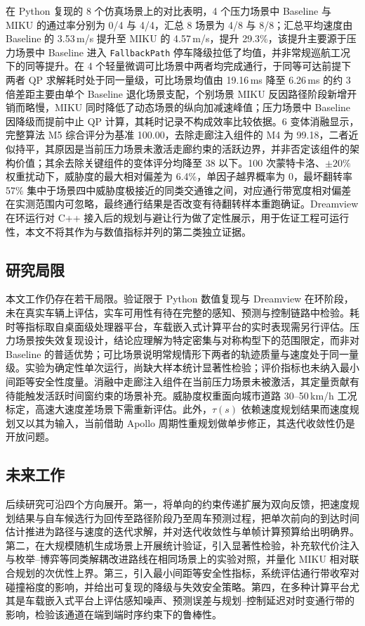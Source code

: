 \documentclass[a4paper,11pt]{ctexart}
\theoremstyle{definition}
\begin{document}
在 Python 复现的 8 个仿真场景上的对比表明，4 个压力场景中 Baseline 与 MIKU 的通过率分别为 0/4 与 4/4，汇总 8 场景为 4/8 与 8/8；汇总平均速度由 Baseline 的 3.53\,m/s 提升至 MIKU 的 4.57\,m/s，提升 29.3\%，该提升主要源于压力场景中 Baseline 进入 \texttt{FallbackPath} 停车降级拉低了均值，并非常规巡航工况下的同等提升。在 4 个轻量微调可比场景中两者均完成通行，于同等可达前提下两者 QP 求解耗时处于同一量级，可比场景均值由 19.16\,ms 降至 6.26\,ms 的约 3 倍差距主要由单个 Baseline 退化场景支配，个别场景 MIKU 反因路径阶段新增开销而略慢，MIKU 同时降低了动态场景的纵向加减速峰值；压力场景中 Baseline 因降级而提前中止 QP 计算，其耗时记录不构成效率比较依据。6 变体消融显示，完整算法 M5 综合评分为基准 100.00，去除走廊注入组件的 M4 为 99.18，二者近似持平，其原因是当前压力场景未激活走廊约束的活跃边界，并非否定该组件的架构价值；其余去除关键组件的变体评分均降至 38 以下。100 次蒙特卡洛、$\pm20\%$ 权重扰动下，威胁度的最大相对偏差为 6.4\%，单因子越界概率为 0，最坏翻转率 57\% 集中于场景四中威胁度极接近的同类交通锥之间，对应通行带宽度相对偏差在实测范围内可忽略，最终通行结果是否改变有待翻转样本重跑确证。Dreamview 在环运行对 C++ 接入后的规划与避让行为做了定性展示，用于佐证工程可运行性，本文不将其作为与数值指标并列的第二类独立证据。

\subsection{研究局限}

本文工作仍存在若干局限。验证限于 Python 数值复现与 Dreamview 在环阶段，未在真实车辆上评估，实车可用性有待在完整的感知、预测与控制链路中检验。耗时等指标取自桌面级处理器平台，车载嵌入式计算平台的实时表现需另行评估。压力场景按失效复现设计，结论应理解为特定密集与对称构型下的范围限定，而非对 Baseline 的普适优势；可比场景说明常规情形下两者的轨迹质量与速度处于同一量级。实验为确定性单次运行，尚缺大样本统计显著性检验；评价指标也未纳入最小间距等安全性度量。消融中走廊注入组件在当前压力场景未被激活，其定量贡献有待能触发活跃时间窗约束的场景补充。威胁度权重面向城市道路 30--50\,km/h 工况标定，高速大速度差场景下需重新评估。此外，$\tau(s)$ 依赖速度规划结果而速度规划又以其为输入，当前借助 Apollo 周期性重规划做单步修正，其迭代收敛性仍是开放问题。

\subsection{未来工作}

后续研究可沿四个方向展开。第一，将单向的约束传递扩展为双向反馈，把速度规划结果与自车候选行为回传至路径阶段乃至周车预测过程，把单次前向的到达时间估计推进为路径与速度的迭代求解，并对迭代收敛性与单帧计算预算给出明确界。第二，在大规模随机生成场景上开展统计验证，引入显著性检验，补充软代价注入与枚举--博弈等同类解耦改进路线在相同场景上的实验对照，并量化 MIKU 相对联合规划的次优性上界。第三，引入最小间距等安全性指标，系统评估通行带收窄对碰撞裕度的影响，并给出可复现的降级与失效安全策略。第四，在多种计算平台尤其是车载嵌入式平台上评估感知噪声、预测误差与规划--控制延迟对时变通行带的影响，检验该通道在端到端时序约束下的鲁棒性。


\printbibliography[heading=bibintoc,title={参考文献}]
\end{document}
